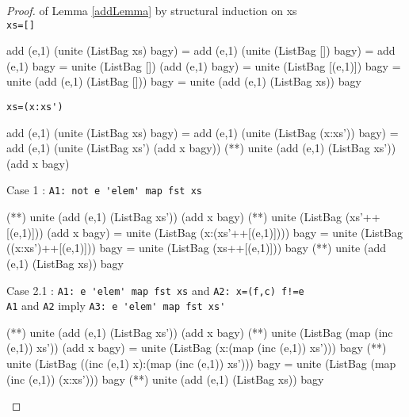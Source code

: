 \begin{proof} of Lemma \ref{addLemma} by structural induction on xs\\
\verb|xs=[]|
\begin{code}
add (e,1) (unite (ListBag xs) bagy) 
             = add (e,1) (unite (ListBag []) bagy)
             = add (e,1) bagy
             = unite (ListBag []) (add (e,1) bagy)
             = unite (ListBag [(e,1)]) bagy
             = unite (add (e,1) (ListBag [])) bagy
             = unite (add (e,1) (ListBag xs)) bagy
\end{code}
\verb|xs=(x:xs')|
\begin{code}
add (e,1) (unite (ListBag xs) bagy)
             = add (e,1) (unite (ListBag (x:xs')) bagy)
             = add (e,1) (unite (ListBag xs') (add x bagy))
             (**) unite (add (e,1) (ListBag xs')) (add x bagy)
\end{code}
\hspace{1cm}Case 1 : \verb|A1: not e 'elem' map fst xs|
\begin{code}
             (**) unite (add (e,1) (ListBag xs')) (add x bagy)
             (**) unite (ListBag (xs'++[(e,1)])) (add x bagy)
             = unite (ListBag (x:(xs'++[(e,1)]))) bagy
             = unite (ListBag ((x:xs')++[(e,1)])) bagy
             = unite (ListBag (xs++[(e,1)])) bagy
             (**) unite (add (e,1) (ListBag xs)) bagy

\end{code}
\hspace{1cm}Case 2.1 : \verb|A1: e 'elem' map fst xs| and \verb|A2: x=(f,c) f!=e|\\
\verb|A1| and \verb|A2| imply \verb|A3: e 'elem' map fst xs'|
\begin{code}
             (**) unite (add (e,1) (ListBag xs')) (add x bagy)
             (**) unite (ListBag (map (inc (e,1)) xs')) (add x bagy)
             = unite (ListBag (x:(map (inc (e,1)) xs'))) bagy
             (**) unite (ListBag ((inc (e,1) x):(map (inc (e,1)) xs'))) bagy
             = unite (ListBag (map (inc (e,1)) (x:xs'))) bagy
             (**) unite (add (e,1) (ListBag xs)) bagy


\end{code}
\end{proof}
